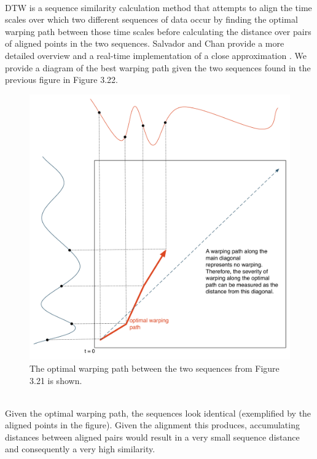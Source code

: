 \documentclass[a4paper,12pt]{report} 	%
\numberwithin{figure}{chapter}
\numberwithin{table}{chapter}
\numberwithin{equation}{chapter}
\begin{document}
\begin{flushleft}
\begin{figure}[h!]
\begin{center}
\end{center}
\end{figure}
\\
DTW is a sequence similarity calculation method that attempts to align the time scales over which two different sequences of data occur by finding the optimal warping path between those time scales before calculating the distance over pairs of aligned points in the two sequences. Salvador and Chan provide a more detailed overview and a real-time implementation of a close approximation \cite{Salvador:2004et}. We provide a diagram of the best warping path given the two sequences found in the previous figure in Figure 3.22. 
\begin{figure}[h!]
\begin{center}
\includegraphics[scale=0.5]{DTWExample}
\caption[Timbre Distance Between Time-Warped Curves]{The optimal warping path between the two sequences from Figure 3.21 is shown.}
\end{center}
\end{figure}
\\
Given the optimal warping path, the sequences look identical (exemplified by the aligned points in the figure). Given the alignment this produces, accumulating distances between aligned pairs would result in a very small sequence distance and consequently a very high similarity.


\end{flushleft}
\end{document}
